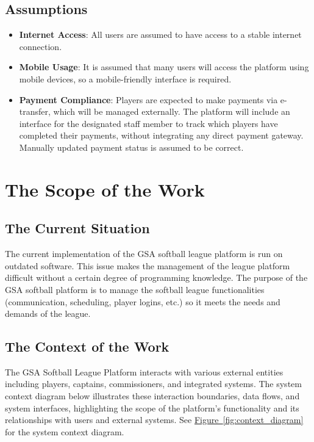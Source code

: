 \documentclass[12pt, titlepage]{article}
\begin{document}
\subsection{Assumptions}
\begin{itemize}
    \item \textbf{Internet Access}: All users are assumed to have access to a stable internet connection.
    \item \textbf{Mobile Usage}: It is assumed that many users will access the platform using mobile devices, so a mobile-friendly interface is required.
    \item \textbf{Payment Compliance}: Players are expected to make payments via e-transfer, which will be managed externally. The platform will include an interface for the designated staff member to track which players have completed their payments, without integrating any direct payment gateway. Manually updated payment status is assumed to be correct.
\end{itemize}

\section{The Scope of the Work}
\subsection{The Current Situation}
The current implementation of the GSA softball league platform is run on outdated software.
This issue makes the management of the league platform difficult without a certain degree of
programming knowledge. The purpose of the GSA softball platform is to manage the softball
league functionalities (communication, scheduling, player logins, etc.) so it meets the needs
and demands of the league.
\subsection{The Context of the Work}
The GSA Softball League Platform interacts with various external entities including players, captains, commissioners, and integrated systems. The system context diagram below illustrates these interaction boundaries, data flows, and system interfaces, highlighting the scope of the platform's functionality and its relationships with users and external systems. See \hyperref[fig:context_diagram]{Figure~\ref{fig:context_diagram}} for the system context diagram.
\end{document}
